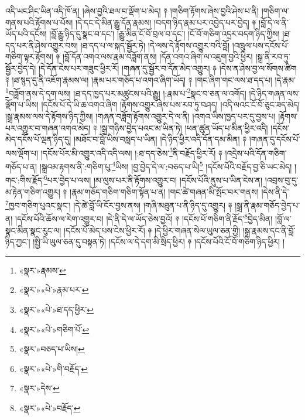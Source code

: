 འདི་ཡང་ཤིང་ཡིན་འདི་ཁོ་ན། །ཞེས་བྱའི་ཐལ་བ་ལྡོག་པ་མེད། ༈ །གཅིག་རྟོགས་ཞེས་བྱའི་ཤེས་པ་ནི། །གཅིག་ལ་གནས་པའི་རྟོགས་པ་པོས། །དེ་དང་དེ་མིན་རྒྱུ་དོན་རྣམས། །བདག་ཉིད་རྣམ་པར་འབྱེད་པར་བྱེད། ༈ །བློ་དེ་ལ་ནི་ཡོད་པའི་དངོས། །བློ་རྒྱུ་ཉིད་དུ་སྣང་བ་དང་། །རྒྱུ་མིན་ངོ་བོ་བྲལ་བ་དང་། །ངོ་བོ་གཅིག་འདྲར་བདག་ཉིད་ཀྱིས། །ཐ་དད་པར་ནི་ཤེས་འགྱུར་བས། །ཐ་དད་པ་ལ་སྐད་སྦྱོར་ཏེ། །དེ་ལས་དེ་རྟོགས་འགྱུར་བའི་བློ། །འཁྲུལ་པས་དངོས་པོ་གཅིག་ལྟར་རྟོགས། ༈ །བློ་དོན་འགའ་ལས་རྣམ་བཟློག་ནས། །དོན་འགའ་ཞིག་ལ་འཇུག་བྱའི་ཕྱིར། །སྒྲ་ནི་རབ་ཏུ་སྦྱོར་བྱེད་དེ། །དེ་དོན་ངེས་པར་གཟུང་ཕྱིར་རོ། །གཞན་དུ་སྦྱོར་བ་དོན་མེད་འགྱུར། ༈ །དེས་ན་ཤེས་བྱ་ལ་སོགས་ཚིག ༈ །ཐ་སྙད་དུ་ནི་འཇོག་རྣམས་ལ། །རྣམ་པར་གཅོད་པ་འགའ་ཞིག་ཡོད། ༈ །གང་ཞིག་གང་ལས་ཐ་དད་པ། །དེ་རྣམ་\footnote{«སྣར་»རྣམས་}བཟློག་ནས་དེ་དག་ལས། །ཐ་དད་ཁྱད་པར་མཚུངས་པའི་རྒྱུ། །:རྣམ་པ་\footnote{«སྣར་»«པེ་»རྣམ་པར་}སྣང་བ་ཅན་ལ་འགོད། །དེ་ཉིད་གཞན་ལས་ལྡོག་པ་ཡིས། །དངོས་པོ་དེ་ཡི་ཆ་འགའ་ཞིག །རྟོགས་འགྱུར་ཞེས་པས་རབ་ཏུ་བཤད། །འདི་ལའང་ངོ་བོ་ཅུང་ཟད་མེད། །སྒྲ་རྣམས་ལས་དེ་རྟོགས་ཉིད་ཀྱིས། །གཞན་བཟློག་རྟོགས་འགྱུར་དེ་ལ་ནི། །འགའ་ཡིས་ཁྱད་པར་དུ་བྱས་པ། །རྟོགས་པར་འགྱུར་བ་གཞན་འགའ་མེད། ༈ །སྒྲ་གཉིས་བྱེད་པའང་མ་ཡིན་ཏེ། །ཕན་ཚུན་ཡོད་པ་མིན་ཕྱིར་འདི། །དངོས་མེད་དངོས་པོ་ལྡན་ཉིད་དུ། །མཐོང་བ་བློ་ཡིས་བསླད་པ་ཡིན། །དེ་ཉིད་ཕྱིར་འདི་དོན་དམ་མིན། ༈ །གཞན་དུ་དངོས་པོ་ལས་ལྡོག་པ། །དངོས་པོར་མི་འགྱུར་འདི་འདི་ལས། །:ཐ་དད་ཅེས་\footnote{«སྣར་»«པེ་»ཐ་དད་ཕྱིར་}ནི་བརྗོད་ཕྱིར་རོ། ༈ །འདྲེས་པའི་དོན་གཅིག་གཅོད་པ་ན། །སྒྲའམ་རྟགས་ནི་:གཅིག་པུ་\footnote{«སྣར་»«པེ་»གཅིག་པོ་}ཡིས། །བྱ་བྱེད་དེ་ལ་:བཅད་པ་ཡི།\footnote{«སྣར་»བཅད་པ་ཡིས།} །དངོས་པོའི་བརྗོད་བྱ་ཅི་ཡང་མེད། །གང་:གིས་རྗོད་\footnote{«སྣར་»«པེ་»གི་བརྗོད་}པར་བྱེད་པ་ལས། །མ་ལུས་པར་ནི་རྟོགས་འགྱུར་བ། །དངོས་པོའི་ནུས་པ་ཡིན་ངེས་ན། །འབྲས་བུ་དུ་མ་རྟེན་གཅིག་འགྱུར། ༈ །རྣམ་གཅོད་གཅིག་གཅིག་སྟོན་པ་ན། །གང་ཚེ་གཞན་མི་སྤོང་བར་གནས། །དེས་ནི་དེ་\footnote{«སྣར་»དེས་}ཁྱབ་གཅིག་པུའང་སྣང་། །དེ་ཚེ་བློ་ཡི་ངོར་བྱས་ནས། །གཞི་མཐུན་པ་ནི་ཉིད་དུ་འགྱུར། ༈ །སྒྲ་ནི་རྣམ་གཅོད་བྱེད་པ་ན། །དངོས་པོའི་ཆོས་ལ་རེག་འགྱུར་བ། །དེ་ནི་དེ་ལ་ཡོད་ཅེས་བྱའོ། ༈ །དངོས་པོ་གཅིག་ནི་རྗོད་\footnote{«སྣར་»«པེ་»བརྗོད་}བྱེད་མིན། །བློ་ལ་སྣང་མིན་སྣང་རུང་ལ། །དངོས་པོ་མེད་པས་ངེས་ཕྱིར་རོ། ༈ །དེ་ཕྱིར་གཞན་སེལ་ཡུལ་ཅན་གྱི། །སྒྲ་རྣམས་དང་ནི་བློ་ཉིད་ཀྱང་། །སྤྱི་ཡི་ཡུལ་ཅན་དུ་བསྟན་ཏེ། །དངོས་ལ་དེ་དག་མི་སྲིད་ཕྱིར། ༈ །དངོས་པོའི་ངོ་བོ་གཅིག་ཉིད་ཕྱིར། །
